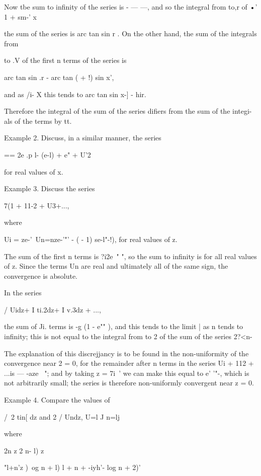 Now tbe sum to infinity of the series is - — —, and so the integral
from to,r of •' 1 + sm-' x

the sum of the series is arc tan sin r . On the other hand, the sum of
the integrals from

to .V of the first n terms of the series is

arc tan sin .r - arc tan ( + !) sin x',

and as /i- X this tends to arc tan sin x-] - hir.

Therefore the integral of the sum of the series difiers from the sum
of the integi-als of the terms by tt.

Example 2. Discuss, in a similar manner, the series

== 2e .p l- (e-l) + e" + U'2

for real values of x.

Example 3. Discuss the series

7(1 + 11-2 + U3+...,

where

Ui = ze-'\ Un=nze-'"' - ( - 1) se-l"-!), for real values of z.

The sum of the first n terms is ?i2e~" ", so the sum to infinity is
for all real values of z. Since the terms Un are real and ultimately
all of the same sign, the convergence is absolute.



In the series



/ Uidz+ I ti.2dz+ I v.3dz + ...,



the sum of Ji. terms is -g (1 - e"" ), and this tends to the limit |
as n tends to infinity; this is not equal to the integral from to 2
of the sum of the series 2?<n-

The explanation of this discrejjancy is to be found in the
non-uniformity of the convergence near 2 = 0, for the remainder after
n terms in the series Ui + 112 + ...is — -aze~ "; and by taking z =
7i~' we can make this equal to e' '"-, which is not arbitrarily small;
the series is therefore non-uniformly convergent near z = 0.

Example 4. Compare the values of

/\ 2 tin[ dz and 2 / Undz, U=l J n=lj

where

2n z 2 n- l) z



"l+n'z )\ og n + l) l + n + -iyh'- log n + 2)'

